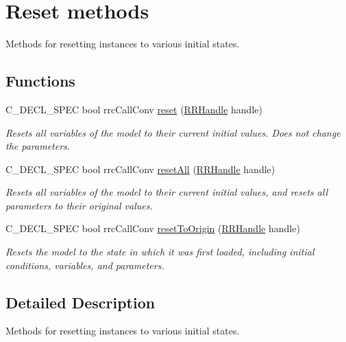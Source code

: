 \hypertarget{group__reset}{}\section{Reset methods}
\label{group__reset}


Methods for resetting instances to various initial states.  


\subsection*{Functions}
\begin{DoxyCompactItemize}
\item 
C\+\_\+\+D\+E\+C\+L\+\_\+\+S\+P\+E\+C bool rrc\+Call\+Conv \hyperlink{group__reset_gabde768cf80e67fe8f2811a28843e41f4}{reset} (\hyperlink{rrc__types_8h_a1d68f0592372208fa5a5f2799ea4b3ae}{R\+R\+Handle} handle)
\begin{DoxyCompactList}\small\item\em Resets all variables of the model to their current initial values. Does not change the parameters. \end{DoxyCompactList}\item 
C\+\_\+\+D\+E\+C\+L\+\_\+\+S\+P\+E\+C bool rrc\+Call\+Conv \hyperlink{group__reset_ga50d3ec99c57ba89550a4deef3129e19f}{reset\+All} (\hyperlink{rrc__types_8h_a1d68f0592372208fa5a5f2799ea4b3ae}{R\+R\+Handle} handle)
\begin{DoxyCompactList}\small\item\em Resets all variables of the model to their current initial values, and resets all parameters to their original values. \end{DoxyCompactList}\item 
C\+\_\+\+D\+E\+C\+L\+\_\+\+S\+P\+E\+C bool rrc\+Call\+Conv \hyperlink{group__reset_ga24d6b0810b8cbf5a7e9b4da38908b6f7}{reset\+To\+Origin} (\hyperlink{rrc__types_8h_a1d68f0592372208fa5a5f2799ea4b3ae}{R\+R\+Handle} handle)
\begin{DoxyCompactList}\small\item\em Resets the model to the state in which it was first loaded, including initial conditions, variables, and parameters. \end{DoxyCompactList}\end{DoxyCompactItemize}


\subsection{Detailed Description}
Methods for resetting instances to various initial states. 



